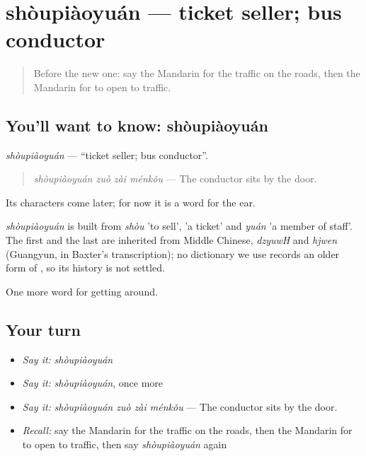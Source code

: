 \section[shòupiàoyuán]{shòupiàoyuán — ticket seller; bus conductor}

\label{lesson:ZH-C409-shoupiaoyuan}



\begin{quote}
Before the new one: say the Mandarin for the traffic on the roads, then the Mandarin for to open to traffic.
\end{quote}

\subsection*{You'll want to know: shòupiàoyuán}
\emph{shòupiàoyuán} — \textquotedblleft{}ticket seller; bus conductor\textquotedblright{}.

\begin{quote}
\emph{shòupiàoyuán zuò zài ménkǒu} — The conductor sits by the door.
\end{quote}

Its characters come later; for now it is a word for the ear.

\begin{cousinweb}
\emph{shòupiàoyuán} is built from \emph{shòu} 'to sell',  'a ticket' and \emph{yuán} 'a member of staff'. The first and the last are inherited from Middle Chinese, \emph{dzyuwH} and \emph{hjwen} (Guangyun, in Baxter's transcription); no dictionary we use records an older form of , so its history is not settled.
\end{cousinweb}

\begin{grammarlens}[title={What you've built}]
One more word for getting around.
\end{grammarlens}

\subsection*{Your turn}
\begin{itemize}
\raggedright
  \item \emph{Say it:} \emph{shòupiàoyuán}
  \item \emph{Say it:} \emph{shòupiàoyuán}, once more
  \item \emph{Say it:} \emph{shòupiàoyuán zuò zài ménkǒu} — The conductor sits by the door.
  \item \emph{Recall:} say the Mandarin for the traffic on the roads, then the Mandarin for to open to traffic, then say \emph{shòupiàoyuán} again
\end{itemize}

